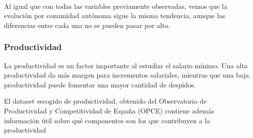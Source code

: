 \documentclass[11pt]{article}
\begin{document}
    \begin{center}
    \end{center}
    { \hspace*{\fill} \\}
    
    Al igual que con todas las variables previamente observadas, vemos que
la evolución por comunidad autónoma sigue la misma tendencia, aunque las
diferencias entre cada una no se pueden pasar por alto.

    \subsubsection{Productividad}\label{productividad}

    La productividad es un factor importante al estudiar el salario mínimo.
Una alta productividad da más margen para incrementos salariales,
mientras que una baja productividad puede fomentar una mayor cantidad de
despidos.

El dataset escogido de productividad, obtenido del Observatorio de
Productividad y Competitividad de España (OPCE) contiene además
información útil sobre qué componentes son los que contribuyen a la
productividad
\end{document}
